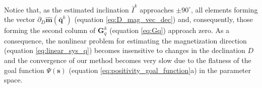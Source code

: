 Notice that, as the estimated inclination $\bar{I}^{k}$ approaches $\pm 90^{\circ}$, 
all elements forming the vector $\partial_{D} \hat{\mathbf{m}}(\bar{\mathbf{q}}^{k})$ 
(equation \ref{eq:D_mag_vec_dec}) and, consequently, those forming the second column of 
$\mathbf{G}_{q}^{k}$ (equation \ref{eq:Gq}) approach zero. 
As a consequence, the nonlinear problem for estimating the magnetization direction 
(equation \ref{eq:linear_sys_q}) becomes insensitive to changes in the declination $D$ 
and the convergence of our method becomes very slow due to the flatness of the goal function 
$\Psi(\mathbf{s})$ (equation \ref{eq:positivity_goal_function}a) in the parameter space.

